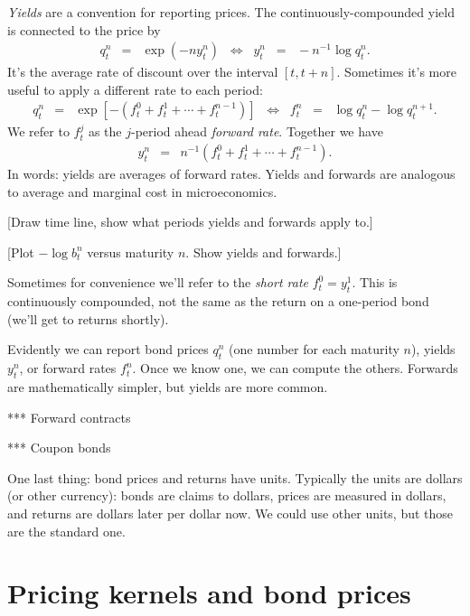 \documentclass[11pt]{article}
\begin{document}
{\it Yields\/} are a convention for reporting prices.
The continuously-compounded yield is connected to the price by
\begin{eqnarray}
    q^n_t &=&  \exp(- n y^n_t)
        \;\;\Leftrightarrow\;\;
        y^n_t \;\;=\;\; - n^{-1} \log q^n_t .
        \label{eq:yields}
\end{eqnarray}
It's the average rate of discount over the interval $[t, t+n]$.
Sometimes it's more useful to apply a different
rate to each period:
\begin{eqnarray}
    q^n_t &=&  \exp[- (f^0_t + f^1_t + \cdots + f^{n-1}_t)]
        \;\;\Leftrightarrow\;\;
        f^n_t \;\;=\;\;  \log q^n_t - \log q^{n+1}_t .
        \label{eq:forwards}
\end{eqnarray}
We refer to $f^j_t$ as the $j$-period ahead {\it forward rate\/}.
Together we have
\begin{eqnarray*}
    y^n_t &=&  n^{-1} \left( f^0_t + f^1_t + \cdots + f^{n-1}_t \right).
\end{eqnarray*}
In words:  yields are averages of forward rates.
Yields and forwards are analogous to average and marginal cost in microeconomics.

[Draw time line, show what periods yields and forwards apply to.]

[Plot $-\log b^n_t$ versus maturity $n$.  Show yields and forwards.]

Sometimes for convenience we'll refer to the {\it short rate\/}
$f^0_t = y^1_t$.
This is continuously compounded, not the same as the return on
a one-period bond (we'll get to returns shortly).

Evidently we can report bond prices $q^n_t$ (one number for each maturity $n$),
yields $y^n_t$, or forward rates $f^n_t$.
Once we know one, we can compute the others.
Forwards are mathematically simpler, but yields are more common.

*** Forward contracts 

*** Coupon bonds 


One last thing:  bond prices and returns have units.
Typically the units are dollars (or other currency):
bonds are claims to dollars, prices are measured in dollars,
and returns are dollars later per dollar now.
We could use other units, but those are the standard one.


\section{Pricing kernels and bond prices}
\end{document}

